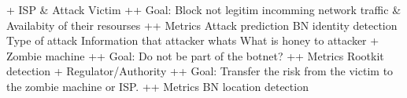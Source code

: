 + ISP & Attack Victim
    ++ Goal: Block not legitim incomming network traffic & Availabity of their resourses
    ++ Metrics
        Attack prediction
        BN identity detection
        Type of attack
        Information that attacker whats
        What is honey to attacker
+ Zombie machine
    ++ Goal: Do not be part of the botnet?
    ++ Metrics
        Rootkit detection
+ Regulator/Authority
    ++ Goal: Transfer the risk from the victim to the zombie machine or ISP.
    ++ Metrics
        BN location detection



